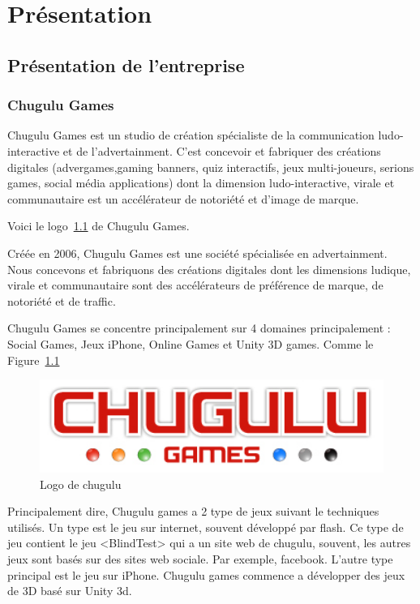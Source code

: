 \chapter{Présentation} %

\section{Présentation de l'entreprise} %

\subsection{Chugulu Games} %

Chugulu Games est un studio de création spécialiste de la communication ludo-interactive et de l'advertainment. C'est concevoir et fabriquer des créations digitales (advergames,gaming banners, quiz interactifs, jeux multi-joueurs, serions games, social média applications) dont la dimension ludo-interactive, virale et communautaire est un accélérateur de notoriété et d'image de marque.

Voici le logo~\ref{fig:Image_Chugulu_Games1} de Chugulu Games.

Créée en 2006, Chugulu Games est une société spécialisée en advertainment. Nous concevons et fabriquons des créations digitales dont les dimensions ludique, virale et communautaire sont des accélérateurs de préférence de marque, de notoriété et de traffic.

Chugulu Games se concentre principalement sur 4 domaines principalement : Social Games, Jeux iPhone, Online Games et Unity 3D games. Comme le Figure~\ref{fig:Image_Chugulu_Games1} 


\begin{figure}[htbp]
	\centering
		\includegraphics[width=6in]{Image/Chugulu-Games1.jpg}
	\caption{Logo de chugulu}
	\label{fig:Image_Chugulu_Games1}
\end{figure}

Principalement dire, Chugulu games a 2 type de jeux suivant le techniques utilisés. Un type est le jeu sur internet, souvent développé par flash. Ce type de jeu contient le jeu <BlindTest> qui a un site web de chugulu, souvent, les autres jeux sont basés sur des sites web sociale. Par exemple, facebook. L'autre type principal est le jeu sur iPhone. Chugulu games commence a développer des jeux de 3D basé sur Unity 3d. 

